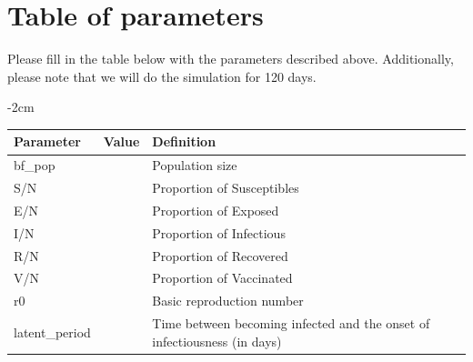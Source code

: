 \documentclass{article}
\begin{document}
\section{Table of parameters}
Please fill in the table below with the parameters described above.
Additionally, please note that we will do the simulation for 120 days.
\begin{table}[htb]
	\centering
    \renewcommand{\arraystretch}{1.3}
	\addtolength{\leftskip} {-2cm}
	\addtolength{\rightskip}{-2cm}
	\begin{tabular}{@{}lll@{}}
		\toprule
		Parameter            & Value              & Definition                                                                            \\ \midrule
		bf\_pop              & \underline{\hspace{1cm}} & Population size                                                                       \\
		S/N                    & \underline{\hspace{1cm}}  & Proportion of Susceptibles                                                            \\
		E/N                    &  \underline{\hspace{1cm}} & Proportion of Exposed                                                                 \\
		I/N                    & \underline{\hspace{1cm}} & Proportion of Infectious                                                              \\
		R/N                    & \underline{\hspace{1cm}} & Proportion of Recovered                                                               \\
		V/N                    & \underline{\hspace{1cm}} & Proportion of Vaccinated                                                              \\
		r0                   & \underline{\hspace{1cm}} & Basic reproduction number                                                             \\
		latent\_period       & \underline{\hspace{1cm}} & Time between becoming infected and the onset of infectiousness (in days)             \\

\end{tabular}
\end{table}
\end{document}
